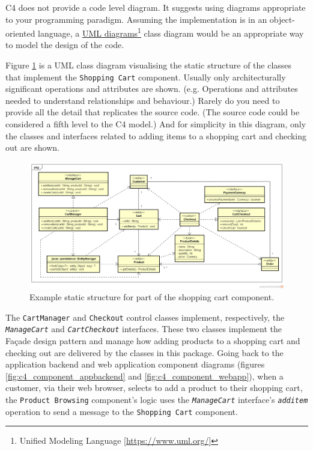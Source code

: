C4 does not provide a code level diagram.
It suggests using diagrams appropriate to your programming paradigm.
Assuming the implementation is in an object-oriented language, a
\href{https://www.uml.org/}{UML diagrams}\footnote{Unified Modeling Language [\url{https://www.uml.org/}]}
class diagram would be an appropriate way to model the design of the code.

Figure \ref{fig:classDiagram} is a UML class diagram visualising the static structure
of the classes that implement the \texttt{Shopping Cart} component.
Usually only architecturally significant operations and attributes are shown.
(e.g. Operations and attributes needed to understand relationships and behaviour.)
Rarely do you need to provide all the detail that replicates the source code.
(The source code could be considered a fifth level to the C4 model.)
And for simplicity in this diagram, only the classes and interfaces related to adding items to a shopping cart and checking out are shown.

\begin{figure}[h]
    \centering
    \begin{adjustwidth}{-10.5mm}{-11mm}
        \includegraphics[trim=22 43 22 44,clip,width=0.98\paperwidth]{images/uml/shopping_cart_class_diagram.png}
    \end{adjustwidth}
    \caption{Example static structure for part of the shopping cart component.}
    \label{fig:classDiagram}
\end{figure}

\noindent
The \texttt{CartManager} and \texttt{Checkout} control classes implement, respectively,
the \texttt{\textsl{ManageCart}} and \texttt{\textsl{Cart\-Check\-out}} interfaces.
These two classes implement the Façade design pattern and manage how
adding products to a shopping cart and checking out are delivered by the classes in this package.
Going back to the application backend and web application component diagrams
(figures \ref{fig:c4_component_appbackend} and \ref{fig:c4_component_webapp}),
when a customer, via their web browser, selects to add a product to their shopping cart,
the \texttt{Product Browsing} component's logic uses the \texttt{\textsl{ManageCart}}
interface's \texttt{\textsl{additem}} operation to send a message to the \texttt{Shopping Cart} component.

